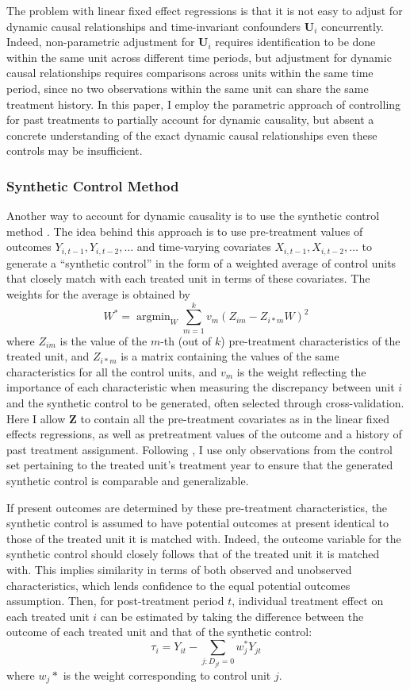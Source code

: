 \documentclass[12pt]{article}\usepackage[]{graphicx}\usepackage[]{color}
\newcommand{\1}{\mathbbm{1}}
\DeclareMathOperator*{\argmin}{argmin}
\begin{document}
The problem with linear fixed effect regressions is that it is not easy to adjust for dynamic causal relationships and time-invariant confounders $\mathbf{U}_i$ concurrently. Indeed, non-parametric adjustment for $\mathbf{U}_i$ requires identification to be done within the same unit across different time periods, but adjustment for dynamic causal relationships requires comparisons across units within the same time period, since no two observations within the same unit can share the same treatment history. In this paper, I employ the parametric approach of controlling for past treatments to partially account for dynamic causality, but absent a concrete understanding of the exact dynamic causal relationships even these controls may be insufficient. 

\subsubsection{Synthetic Control Method}
\label{sec:syp}

Another way to account for dynamic causality is to use the synthetic control method \citep{Abadie2010, Abadie2015}. The idea behind this approach is to use pre-treatment values of outcomes $Y_{i,t-1},Y_{i, t-2},\dots$ and time-varying covariates $X_{i,t-1},X_{i, t-2},\dots$ to generate a ``synthetic control'' in the form of a weighted average of control units that closely match with each treated unit in terms of these covariates. The weights for the average is obtained by
$$
	W^* = \argmin_W \sum_{m=1}^{k}v_m(Z_{im} - Z_{i*m}W)^2
$$
where $Z_{im}$ is the value of the $m$-th (out of $k$) pre-treatment characteristics of the treated unit, and $Z_{i*m}$ is a matrix containing the values of the same characteristics for all the control units, and $v_m$ is the weight reflecting the importance of each characteristic when measuring the discrepancy between unit $i$ and the synthetic control to be generated, often selected through cross-validation. Here I allow $\mathbf{Z}$ to contain all the pre-treatment covariates as in the linear fixed effects regressions, as well as pretreatment values of the outcome and a history of past treatment assignment. Following \citep{Abadie2010, Abadie2015}, I use only observations from the control set pertaining to the treated unit's treatment year to ensure that the generated synthetic control is comparable and generalizable.

If present outcomes are determined by these pre-treatment characteristics, the synthetic control is assumed to have potential outcomes at present identical to those of the treated unit it is matched with. Indeed, the outcome variable for the synthetic control should closely follows that of the treated unit it is matched with. This implies similarity in terms of both observed and unobserved characteristics, which lends confidence to the equal potential outcomes assumption. Then, for post-treatment period $t$, individual treatment effect on each treated unit $i$ can be estimated by taking the difference between the outcome of each treated unit and that of the synthetic control:
$$
	\tau_i = Y_{it} - \sum_{j:D_{jt}=0}w_j^*Y_{jt}
$$
where $w_j*$ is the weight corresponding to control unit $j$. 
\end{document}

